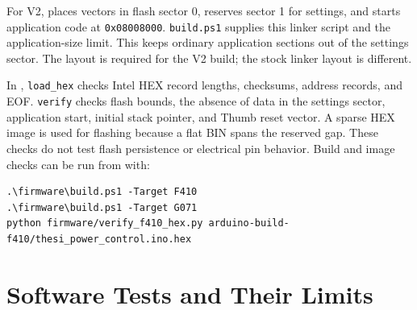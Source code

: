 For V2,  places vectors in flash
sector 0, reserves sector 1 for settings, and starts application
code at \texttt{0x08008000}. \texttt{build.ps1} supplies this
linker script and the application-size limit. This keeps ordinary
application sections out of the settings sector. The layout is
required for the V2 build; the stock linker layout is different.

In , \texttt{load\_hex} checks
Intel HEX record lengths, checksums, address records, and EOF. \texttt{verify}
checks flash bounds, the absence of data in the settings sector, application
start, initial stack pointer, and Thumb reset vector. A sparse HEX image
is used for flashing because a flat BIN spans the reserved gap. These
checks do not test flash persistence or electrical pin behavior. Build
and image checks can be run from  with:

\begin{lstlisting}[caption={Firmware build and HEX-check commands.},label={lst:app-firmware-reproduce}]
.\firmware\build.ps1 -Target F410
.\firmware\build.ps1 -Target G071
python firmware/verify_f410_hex.py arduino-build-f410/thesi_power_control.ino.hex
\end{lstlisting}

\section{Software Tests and Their Limits}
\label{sec:app-software-tests}

